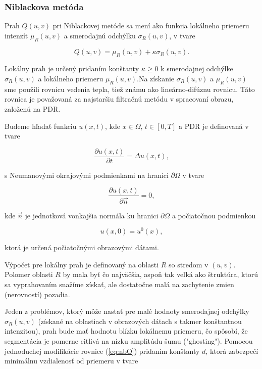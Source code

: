 \documentclass[a4paper,11pt,twoside]{article}%
\begin{document}
\subsubsection{Niblackova metóda}
Prah $Q(u, v)$ pri Niblackovej metóde sa mení ako funkcia lokálneho priemeru intenzít $\mu_R(u,v)$ a smerodajnú odchýlku $\sigma_R(u,v)$, v tvare

\begin{equation} \label{eq:nbO}
Q(u,v) = \mu_R(u,v) + \kappa\sigma_R(u,v).
\end{equation}

Lokálny prah je určený pridaním konštanty $\kappa \geq 0$ k smerodajnej odchýlke $\sigma_R(u,v)$ a lokálneho priemeru $\mu_R(u,v)$.Na získanie $\sigma_R(u,v)$ a $\mu_R(u,v)$ sme použili rovnicu vedenia tepla, tiež známu ako lineárno-difúznu rovnicu. Táto rovnica je považovaná za najstaršiu filtračnú metódu v spracovaní obrazu, založenú na PDR.

Budeme hľadať funkciu $u(x, t)$, kde $x \in \Omega$, $t \in [0, T]$ a PDR je definovaná v tvare

\begin{equation}
\frac{\partial u(x, t)}{\partial t} = \Delta u(x,t),
\end{equation}

s Neumanovými okrajovými podmienkami na hranici $\partial \Omega$ v tvare

\begin{equation}
\frac{\partial u(x, t)}{\partial \vec{n}} = 0,
\end{equation}

kde $\vec{n}$ je jednotková vonkajšia normála ku hranici $\partial \Omega$ a počiatočnou podmienkou 

\begin{equation}
u(x, 0) = u^0(x),
\end{equation}

ktorá je určená počiatočnými obrazovými dátami.

Výpočet pre lokálny prah je definovaný na oblasti $R$ so stredom v $(u, v)$. Polomer oblasti $R$ by mala byť čo najväčšia, aspoň tak veľká ako štruktúra, ktorú sa vyprahovaním snažíme získať, ale dostatočne malá na zachytenie zmien (nerovností) pozadia. 

Jeden z problémov, ktorý môže nastať pre malé hodnoty smerodajnej odchýlky $\sigma_R(u,v)$ (získané na oblastiach v obrazových dátach s takmer konštantnou intenzitou), prah bude mať hodnotu blízku lokálnemu priemeru, čo spôsobí, že segmentácia je pomerne citlivá na nízku amplitúdu šumu ("ghosting"). Pomocou jednoduchej modifikácie rovnice (\ref{eq:nbO}) pridaním konštanty $d$, ktorá zabezpečí minimálnu vzdialenosť od priemeru v tvare
\end{document}
